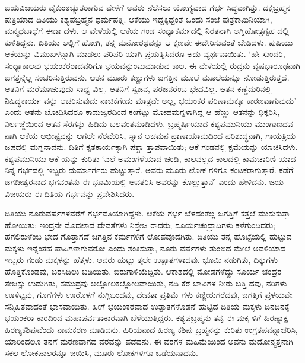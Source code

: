 ಜಯವಿಜಯರು ವೈಕುಂಠಚ್ಯುತರಾಗುವ ವೇಳೆಗೆ ಅವರು ನೆಲೆಸಲು ಯೋಗ್ಯವಾದ ಗರ್ಭ ಸಿದ್ಧವಾಗಿತ್ತು. ದಕ್ಷಬ್ರಹ್ಮನ ಪುತ್ರಿಯಾದ ದಿತಿಯು ಕಶ್ಯಪಬ್ರಹ್ಮನ ಧರ್ಮಪತ್ನಿ. ಆಕೆಯು ಇದ್ದಕ್ಕಿದ್ದಂತೆ ಒಂದು ಸಂಜೆ ಪುತ್ರಕಾಮಿನಿಯಾಗಿ, ಮನ್ಮಥಬಾಧೆಗೆ ಈಡಾ ದಳು. ಆ ವೇಳೆಯಲ್ಲಿ ಆಕೆಯ ಗಂಡ ಸಂಧ್ಯಾಕರ್ಮದಲ್ಲಿ ನಿರತನಾಗಿ ಅಗ್ನಿಹೋತ್ರಗೃಹ ದಲ್ಲಿ ಕುಳಿತಿದ್ದನು. ದಿತಿಯು ಅಲ್ಲಿಗೆ ಹೋಗಿ, ತನ್ನ ಮನೋರಥವನ್ನು ಆ ಕ್ಷಣವೇ ಈಡೇರಿಸುವಂತೆ ಬೇಡಿದಳು. ಪುಷಿಯು ಆಕೆಯನ್ನು ವಿಮುಖಳನ್ನಾಗಿ ಮಾಡಲು ಪರಿಪರಿ ಯಾಗಿ ಪ್ರಯತ್ನಿಸಿದರೂ ಅದು ವ್ಯರ್ಥವಾಯಿತು. ‘ಹೇ ಸುಂದರಿ, ಸಂಧ್ಯಾಕಾಲವು ಭಯಂಕರರಾದವರಿಗೂ ಭಯವನ್ನುಂಟುಮಾಡುವ ಕಾಲ. ಈ ವೇಳೆಯಲ್ಲಿ ರುದ್ರನು ವೃಷಭಾರೂಢನಾಗಿ ಜಗತ್ತನ್ನೆಲ್ಲ ಸಂಚರಿಸುತ್ತಿರುವನು. ಆತನ ಮೂರು ಕಣ್ಣುಗಳು ಜಗತ್ತಿನ ಮೂಲೆ ಮೂಲೆಯನ್ನೂ ನೋಡುತ್ತಿರುತ್ತದೆ. ಆತನಿಗೆ ಮರೆಮಾಚುವುದು ಸಾಧ್ಯ ವಿಲ್ಲ. ಆತನಿಗೆ ಸ್ವಜನ, ಪರಜನರೆಂಬ ಭೇದವಿಲ್ಲ. ಆತನ ಕಣ್ಣೆದುರಿನಲ್ಲಿ ನಿಷಿದ್ಧಕಾರ್ಯ ವನ್ನು ಆಚರಿಸುವುದು ನಾಚಿಕೆಗೇಡು ಮಾತ್ರವೇ ಅಲ್ಲ, ಭಯಂಕರ ಪರಿಣಾಮಕ್ಕೂ ಕಾರಣವಾಗುವುದು’ ಎಂದು ಆತನು ಬೋಧಿಸಿದರೂ ಕಾಮಜ್ವರದಿಂದ ಕಂಗೆಟ್ಟು ಮೋಹಮಗ್ನಳಾಗಿದ್ದ ಆ ಹೆಣ್ಣು ಆತನನ್ನು ಧಿಕ್ಕರಿಸಿ, ನಿರ್ಲಜ್ಜೆಯಿಂದ ಆತನ ಸೆರಗನ್ನು ಹಿಡಿದು ಬಲವಂತಮಾಡಿದಳು. ಬ್ರಹ್ಮರ್ಷಿಯಾದ ಕಶ್ಯಪಮುನಿಯು ಮುಂಗಾಣದವ ನಾಗಿ ಆಕೆಯ ಅಭೀಷ್ಟವನ್ನು ಆಗಲೇ ನೆರವೇರಿಸಿ, ಸ್ನಾನ ಆಚಮನ ಪ್ರಾಣಾಯಾಮದಿಂದ ಪರಿಶುದ್ಧನಾಗಿ, ಗಾಯತ್ರಿಯ ಜಪದಲ್ಲಿ ಮಗ್ನನಾದನು. ದಿತಿಗೆ ಕೃತಕಾರ್ಯಕ್ಕಾಗಿ ಪಶ್ಚಾ ತ್ತಾಪವಾಯಿತು; ಆಕೆ ಗಂಡನಲ್ಲಿ ಕ್ಷಮೆಯನ್ನು ಯಾಚಿಸಿದಳು. ಕಶ್ಯಪಮುನಿಯು ಆಕೆ ಯನ್ನು ಕುರಿತು ‘ಎಲೆ ಅಮಂಗಳೆಯಾದ ಚಂಡಿ, ಕಾಲವಲ್ಲದ ಕಾಲದಲ್ಲಿ ಕಾಮಚಾರಿಣಿ ಯಾದ ನಿನ್ನ ಗರ್ಭದಲ್ಲಿ ಇಬ್ಬರು ದುರ್ಮಾರ್ಗರು ಹುಟ್ಟುತ್ತಾರೆ. ಅವರು ಮೂರು ಲೋಕ ಗಳಿಗೂ ಕಂಟಕರಾಗುತ್ತಾರೆ. ಕಡೆಗೆ ಜಗದೀಶ್ವರನಾದ ಭಗವಂತನು ಈ ಭೂಮಿಯಲ್ಲಿ ಅವತರಿಸಿ ಅವರನ್ನು ಕೊಲ್ಲುತ್ತಾನೆ’ ಎಂದು ಹೇಳಿದನು. ಜಯ ವಿಜಯರು ಈ ದಿತಿಯ ಗರ್ಭವನ್ನು ಪ್ರವೇಶಿಸಿದರು.

ದಿತಿಯು ನೂರುವರ್ಷಗಳವರೆಗೆ ಗರ್ಭವತಿಯಾಗಿದ್ದಳು. ಆಕೆಯ ಗರ್ಭ ಬೆಳದಂತೆಲ್ಲ ಜಗತ್ತಿಗೆ ಕತ್ತಲೆ ಮುಸುಕುತ್ತಾ ಹೋಯಿತು; ಇಂದ್ರನೇ ಮೊದಲಾದ ದೇವತೆಗಳು ನಿಸ್ತೇಜ ರಾದರು; ಸೂರ್ಯಚಂದ್ರಾದಿಗಳು ಕಳೆಗುಂದಿದರು; ಹಗಲಿರುಳೆಂಬ ಭೇದ ಗೊತ್ತಾಗದೆ ಜಗತ್ತಿನ ಕರ್ಮಗಳಿಗೆ ಲೋಪವೊದಗಿತು. ದಿತಿಯು ತನ್ನ ಹೊಟ್ಟೆಯಲ್ಲಿ ಹುಟ್ಟುವ ಮಕ್ಕಳು ಇನ್ನೆಂತಹ ಪಾಪಿಗಳಾಗುವರೋ ಎಂದು ಶಂಕಿಸುತ್ತಾ, ನೂರು ವರ್ಷಗಳು ತುಂಬಿದ ಮೇಲೆ ಅವಳಿಯಾದ ಇಬ್ಬರು ಗಂಡು ಮಕ್ಕಳನ್ನು ಹೆತ್ತಳು. ಅವರು ಹುಟ್ಟು ತ್ತಲೇ ಉತ್ಪಾತಗಳಾದವು. ಭೂಮಿ ನಡುಗಿತು, ದಿಕ್ಕುಗಳು ಹೊತ್ತಿಕೊಂಡವು, ಬರಸಿಡಿಲು ಬಡಿಯಿತು, ಬಿರುಗಾಳಿಯೆದ್ದಿತು. ಆಕಾಶದಲ್ಲಿ ಮೋಡಗಳೆದ್ದು ಸೂರ್ಯ ಚಂದ್ರರ ತೇಜಸ್ಸು ಉಡುಗಿತು, ಸಮುದ್ರವು ಅಲ್ಲೋಲಕಲ್ಲೋಲವಾಯಿತು, ನದಿ ಕೆರೆ ಬಾವಿಗಳ ನೀರು ಬತ್ತಿ ದವು, ನರಿಗಳು ಊಳಿಟ್ಟವು, ಗೂಗೆಗಳು ಊರೊಳಗೆ ನುಗ್ಗಿಬಂದವು, ದೇವತಾ ಪ್ರತಿಮೆ ಗಳು ಕಣ್ಣೀರುಗರೆದವು, ಜಗತ್ತಿಗೆ ಪ್ರಳಯವೇ ಸನ್ನಿಹಿತವಾದಂತೆ ಭಾಸವಾಯಿತು. ಹೀಗೆ ಭಯಂಕರವಾದ ಉತ್ಪಾತಗಳೊಡನೆ ಹುಟ್ಟಿದ ದಿತಿಯ ಮಕ್ಕಳು ದಿನದಿನಕ್ಕೆ ಭಯಂಕರಾ ಕಾರದಿಂದ ಮಹಾಪರ್ವತಾಕಾರವಾಗಿ ಬೆಳೆಯುತ್ತಿದ್ದರು. ಕಶ್ಯಪಬ್ರಹ್ಮನು ತನ್ನ ಈ ಮಕ್ಕ ಳಿಗೆ ಹಿರಣ್ಯಾಕ್ಷ ಹಿರಣ್ಯಕಶಿಪುವೆಂದು ನಾಮಕರಣ ಮಾಡಿದನು. ಹಿರಿಯನಾದ ಹಿರಣ್ಯ ಕಶಿಪು ಬ್ರಹ್ಮನನ್ನು ಕುರಿತು ಉಗ್ರತಪವನ್ನಾಚರಿಸಿ, ಯಾರಿಂದಲೂ ತನಗೆ ಮರಣವಾಗದ ವರವನ್ನು ಪಡೆದನು. ಈ ವರಗಳ ಮಹಿಮೆಯಿಂದ ಅವನು ಮದೋನ್ಮತ್ತನಾಗಿ ಸಕಲ ಲೋಕಪಾಲರನ್ನೂ ಜಯಿಸಿ, ಮೂರು ಲೋಕಗಳಿಗೂ ಒಡೆಯನಾದನು. 

